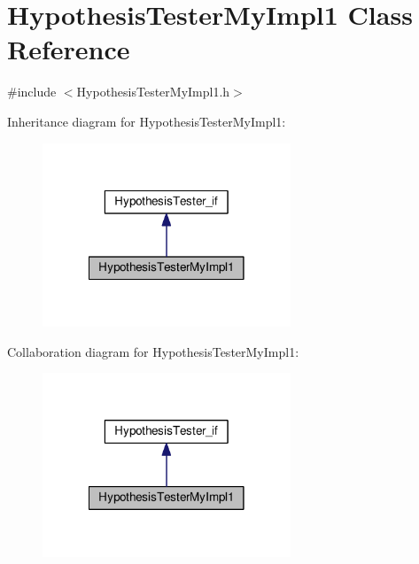 \hypertarget{class_hypothesis_tester_my_impl1}{\section{Hypothesis\-Tester\-My\-Impl1 Class Reference}
\label{class_hypothesis_tester_my_impl1}
}


{\ttfamily \#include $<$Hypothesis\-Tester\-My\-Impl1.\-h$>$}



Inheritance diagram for Hypothesis\-Tester\-My\-Impl1\-:
\nopagebreak
\begin{figure}[H]
\begin{center}
\leavevmode
\includegraphics[width=210pt]{class_hypothesis_tester_my_impl1__inherit__graph}
\end{center}
\end{figure}


Collaboration diagram for Hypothesis\-Tester\-My\-Impl1\-:
\nopagebreak
\begin{figure}[H]
\begin{center}
\leavevmode
\includegraphics[width=210pt]{class_hypothesis_tester_my_impl1__coll__graph}
\end{center}
\end{figure}
